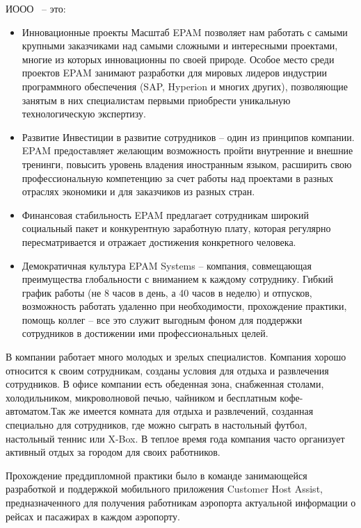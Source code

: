 ИООО~\company{} – это:
\begin{itemize}
  \item Инновационные проекты
  Масштаб EPAM позволяет нам работать с самыми крупными заказчиками над самыми сложными и интересными проектами, многие из которых инновационны по своей природе. Особое место среди проектов EPAM занимают разработки для мировых лидеров индустрии программного обеспечения (SAP, Hyperion и многих других), позволяющие занятым в них специалистам первыми приобрести уникальную технологическую экспертизу.
  \item Развитие
  Инвестиции в развитие сотрудников – один из принципов компании. EPAM предоставляет желающим возможность пройти внутренние и внешние тренинги, повысить уровень владения иностранным языком, расширить свою профессиональную компетенцию за счет работы над проектами в разных отраслях экономики и для заказчиков из разных стран.
  \item Финансовая стабильность
  EPAM предлагает сотрудникам широкий социальный пакет и конкурентную заработную плату, которая регулярно пересматривается и отражает достижения конкретного человека.
  \item Демократичная культура
  EPAM Systems – компания, совмещающая преимущества глобальности с вниманием к каждому сотруднику. Гибкий график работы (не 8 часов в день, а 40 часов в неделю) и отпусков, возможность работать удаленно при необходимости, прохождение практики, помощь коллег – все это служит выгодным фоном для поддержки сотрудников в достижении ими профессиональных целей.
\end{itemize}

В компании работает много молодых и зрелых специалистов.
Компания хорошо относится к своим сотрудникам, созданы условия для отдыха и развлечения сотрудников.
В офисе компании есть обеденная зона, снабженная столами, холодильником, микроволновой печью, чайником и бесплатным кофе-автоматом.Так же имеется комната для отдыха и развлечений, созданная специально для сотрудников, где можно сыграть в настольный футбол, настольный теннис или X-Box. В теплое время года компания часто организует активный отдых за городом для своих работников.

Прохождение преддипломной практики было в команде занимающейся разработкой и поддержкой мобильного приложения Customer Host Assist, предназначенного для получения работникам аэропорта актуальной информации о рейсах и пасажирах в каждом аэропорту.
